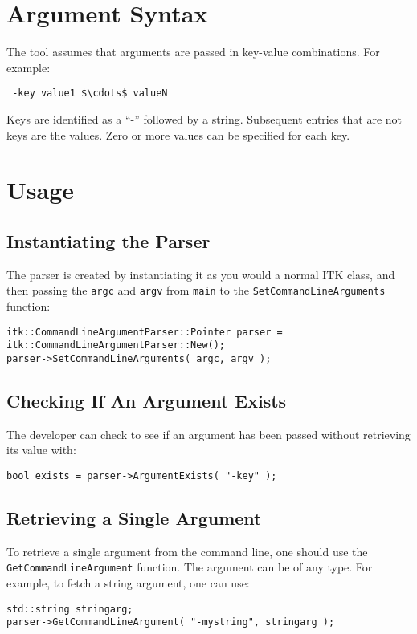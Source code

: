 \documentclass{InsightArticle}
\begin{document}
\section{Argument Syntax}
The tool assumes that arguments are passed in key-value
combinations. For example:
\begin{verbatim}
 -key value1 $\cdots$ valueN
\end{verbatim}
Keys are identified as a ``-'' followed by a string. Subsequent entries that are not keys are the values. Zero or more values can be specified for each key.

\section{Usage}

\subsection{Instantiating the Parser}
The parser is created by instantiating it as you would a normal ITK class, and then passing the \verb|argc| and \verb|argv| from \verb|main| to the \verb|SetCommandLineArguments| function:
\small
\begin{verbatim}
itk::CommandLineArgumentParser::Pointer parser = itk::CommandLineArgumentParser::New();
parser->SetCommandLineArguments( argc, argv );
\end{verbatim}
\normalsize 

\subsection{Checking If An Argument Exists}
The developer can check to see if an argument has been passed without retrieving its value with:
\small
\begin{verbatim}
bool exists = parser->ArgumentExists( "-key" );
\end{verbatim}
\normalsize 

\subsection{Retrieving a Single Argument}
To retrieve a single argument from the command line, one should use the \verb|GetCommandLineArgument| function. The argument can be of any type. For example, to fetch a string argument, one can use:

\small
\begin{verbatim}
std::string stringarg;
parser->GetCommandLineArgument( "-mystring", stringarg );
\end{verbatim}
\normalsize 
\end{document}

